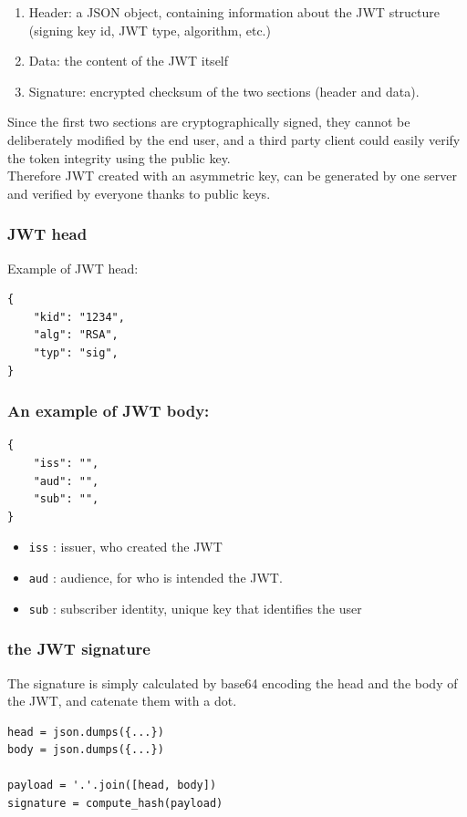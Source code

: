 \documentclass[11pt]{style}
\begin{document}
\begin{enumerate}
    \item Header: a JSON object, containing information about the JWT structure
        (signing key id, JWT type, algorithm, etc.)
    \item Data: the content of the JWT itself
    \item Signature: encrypted checksum of the two sections (header and data).
\end{enumerate}

Since the first two sections are cryptographically signed, they cannot be
deliberately modified by the end user, and a third party client could easily
verify the token integrity using the public key.
\\
Therefore JWT created with an asymmetric key, can be generated by one server and
verified by everyone thanks to public keys.

\subsubsection{JWT head}
Example of JWT head:
\begin{lstlisting}
{
    "kid": "1234",
    "alg": "RSA",
    "typ": "sig",
}
\end{lstlisting}

\subsubsection{An example of JWT body:}
\begin{lstlisting}
{
    "iss": "",
    "aud": "",
    "sub": "",
}
\end{lstlisting}
\begin{itemize}
    \item \texttt{iss} : issuer, who created the JWT
    \item \texttt{aud} : audience, for who is intended the JWT.
    \item \texttt{sub} : subscriber identity, unique key that identifies the
        user
\end{itemize}

\subsubsection{the JWT signature}
The signature is simply calculated by base64 encoding the head and the body of
the JWT, and catenate them with a dot.
\begin{lstlisting}
head = json.dumps({...})
body = json.dumps({...})

payload = '.'.join([head, body])
signature = compute_hash(payload)
\end{lstlisting}
\end{document}
